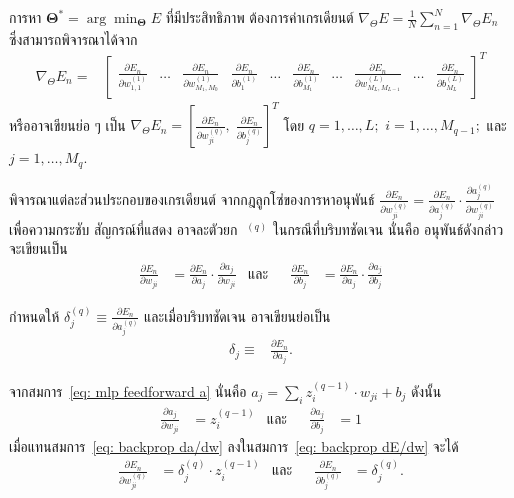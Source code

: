 การหา
$\bm{\Theta}^\ast = \arg\min_{\bm{\Theta}} E$
ที่มีประสิทธิภาพ ต้องการค่าเกรเดียนต์ $\nabla_{\Theta} E = \frac{1}{N} \sum_{n=1}^N \nabla_{\Theta} E_n$ ซึ่งสามารถพิจารณาได้จาก
\begin{align}
\nabla_{\Theta} E_n =& 
\begin{bmatrix}
\frac{\partial E_n}{\partial w_{1,1}^{(1)}}
& \ldots &
\frac{\partial E_n}{\partial w_{M_1,M_0}^{(1)}}
&
\frac{\partial E_n}{\partial b_1^{(1)}}
& \ldots &
\frac{\partial E_n}{\partial b_{M_1}^{(1)}}
& \ldots &
\frac{\partial E_n}{\partial w_{M_L,M_{L-1}}^{(L)}}
& \ldots &
\frac{\partial E_n}{\partial b_{M_L}^{(L)}}
\end{bmatrix}^T
\label{eq: backprop grad dEn}
\end{align}
หรืออาจเขียนย่อ ๆ เป็น
$\nabla_{\Theta} E_n = \left[ \frac{\partial E_n}{\partial w_{ji}^{(q)}}, \; \frac{\partial E_n}{\partial b_j^{(q)}} \right]^T$
โดย $q=1,\ldots,L;$ 
$i=1,\ldots,M_{q-1};$
และ $j=1,\ldots,M_q$.

พิจารณาแต่ละส่วนประกอบของเกรเดียนต์ 
จากกฎลูกโซ่ของการหาอนุพันธ์
$\frac{\partial E_n}{\partial w_{ji}^{(q)}} =
\frac{\partial E_n}{\partial a_j^{(q)}} \cdot
\frac{\partial a_j^{(q)}}{\partial w_{ji}^{(q)}}$
เพื่อความกระชับ
สัญกรณ์ที่แสดง อาจละตัวยก $\;^{(q)}$ ในกรณีที่บริบทชัดเจน
นั่นคือ อนุพันธ์ดังกล่าวจะเขียนเป็น
\begin{align}
\frac{\partial E_n}{\partial w_{ji}} 
& =
\frac{\partial E_n}{\partial a_j} \cdot
\frac{\partial a_j}{\partial w_{ji}}
&
\mbox{และ} &&
\frac{\partial E_n}{\partial b_j} & =
\frac{\partial E_n}{\partial a_j} \cdot
\frac{\partial a_j}{\partial b_j}
\label{eq: backprop dE/dw}
\end{align}

กำหนดให้ $\delta_j^{(q)} \equiv \frac{\partial E_n}{\partial a_j^{(q)}}$ และเมื่อบริบทชัดเจน อาจเขียนย่อเป็น
\begin{align}
\delta_j \equiv &
\frac{\partial E_n}{\partial a_j}
\label{eq: backprop delta}.
\end{align}

จากสมการ~\ref{eq: mlp feedforward a} นั่นคือ $a_j = \sum_i z_i^{(q-1)} \cdot w_{ji} + b_j$ 
ดังนั้น
\begin{align}
\frac{\partial a_j}{\partial w_{ji}}
&
= z_i^{(q-1)}
&
\mbox{และ} &&
\frac{\partial a_j}{\partial b_j} &
= 1
\label{eq: backprop da/dw}
\end{align}
เมื่อแทนสมการ~\ref{eq: backprop da/dw} ลงในสมการ~\ref{eq: backprop dE/dw} จะได้
\begin{align}
\frac{\partial E_n}{\partial w_{ji}^{(q)}}
&
= \delta_j^{(q)} \cdot z_i^{(q-1)}
&
\mbox{และ} &&
\frac{\partial E_n}{\partial b_j^{(q)}} &
= \delta_j^{(q)}
\label{eq: backprop dE/dw in delta}.
\end{align}

